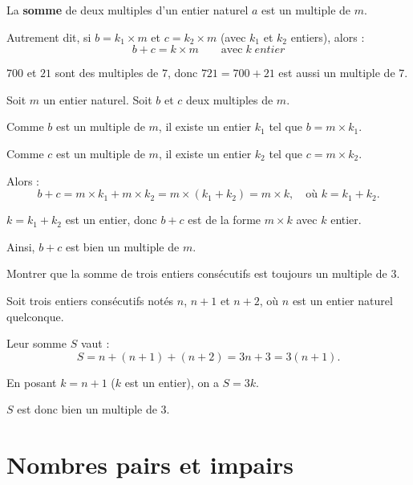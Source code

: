 \begin{prop}
	La \textbf{somme} de deux multiples d'un entier naturel $a$ est un multiple de $m$.

	Autrement dit, si $b = k_1 \times m$ et $c = k_2 \times m$ (avec $k_1$ et $k_2$ entiers), alors :
	\[
		b + c = k \times m\qquad \text{avec}\; k\; {entier}
	\]
\end{prop}

\begin{ex}
	$700$ et $21$ sont des multiples de $7$, donc $721 = 700 + 21$ est aussi un multiple de $7$.
\end{ex}

\begin{demo}
	Soit $m$ un entier naturel. Soit $b$ et $c$ deux multiples de $m$.

	Comme $b$ est un multiple de $m$, il existe un entier $k_1$ tel que $b = m \times k_1$.

	Comme $c$ est un multiple de $m$, il existe un entier $k_2$ tel que $c = m \times k_2$.

	Alors :
	\[
		b + c = m \times k_1 + m \times k_2 = m \times (k_1 + k_2) = m \times k, \quad \text{où } k = k_1 + k_2.
	\]

	$k = k_1 + k_2$ est un entier, donc $b + c$ est de la forme $m \times k$ avec $k$ entier.

	Ainsi, $b + c$ est bien un multiple de $m$.
\end{demo}

\newpage

\begin{methode}
	Montrer que la somme de trois entiers consécutifs est toujours un multiple de $3$.

	\begin{correction}
		Soit trois entiers consécutifs notés $n$, $n + 1$ et $n + 2$, où $n$ est un entier naturel quelconque.

		Leur somme $S$ vaut :
		\[
			S = n + (n + 1) + (n + 2) = 3n + 3 = 3(n + 1).
		\]

		En posant $k = n + 1$ ($k$ est un entier), on a $S = 3k$.

		$S$ est donc bien un multiple de $3$.
	\end{correction}
\end{methode}

\section{Nombres pairs et impairs}


